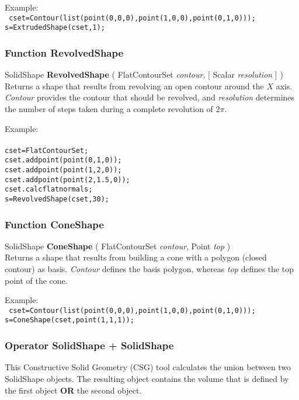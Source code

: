 \documentclass[10pt]{book}
\newcommand{\sourcecode}[1]{\texttt{#1}}
\newcommand{\var}[1]{\textit{#1}}
\begin{document}
Example: \\
\sourcecode{
cset=Contour(list(point(0,0,0),point(1,0,0),point(0,1,0))); \\
s=ExtrudedShape(cset,1); \\
}

\subsubsection{Function RevolvedShape \label{F:RevolvedShape}}
SolidShape \textbf{RevolvedShape} ( FlatContourSet \textit{contour},  [ Scalar \textit{resolution} ] ) \\
Returns a shape that results from revolving an open contour around the $X$ axis. \var{Contour} provides the contour that should be revolved, and \var{resolution} determines the number of steps taken during a complete revolution of $2 \pi$.


Example: \\
\sourcecode{ \\
cset=FlatContourSet; \\
cset.addpoint(point(0,1,0)); \\
cset.addpoint(point(1,2,0)); \\
cset.addpoint(point(2,1.5,0)); \\
cset.calcflatnormals; \\
s=RevolvedShape(cset,30); \\
}

\subsubsection{Function ConeShape \label{F:ConeShape}}
SolidShape \textbf{ConeShape} ( FlatContourSet \textit{contour}, Point \textit{top} ) \\
Returns a shape that results from building a cone with a polygon (closed contour) as basis. \var{Contour} defines the basis polygon, whereas \var{top} defines the top point of the cone.

Example: \\
\sourcecode{
cset=Contour(list(point(0,0,0),point(1,0,0),point(0,1,0))); \\
s=ConeShape(cset,point(1,1,1)); \\
}

\subsubsection{Operator SolidShape + SolidShape \label{O:SolidShape+SolidShape}}
This Constructive Solid Geometry (CSG) tool calculates the union between two SolidShape objects. The resulting object contains the volume that is defined by the first object \textbf{OR} the second object.
\end{document}

